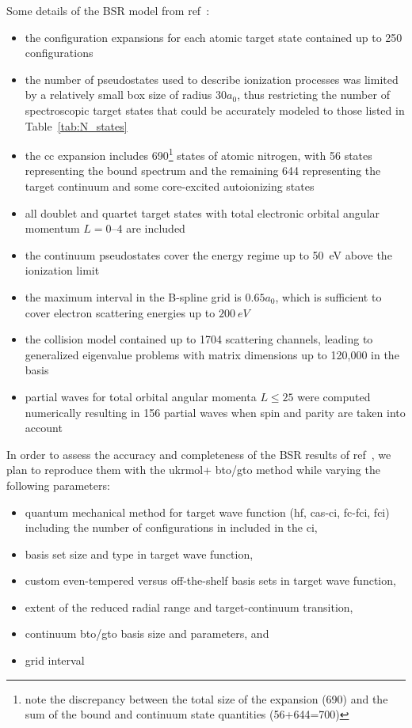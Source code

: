 Some details of the BSR model from ref~\cite{wang2014}:
\begin{itemize}
		\item the configuration expansions for each atomic target state
				contained up to 250 configurations
		\item the number of pseudostates used to describe ionization processes
				was limited by a relatively small box size of radius $30 a_0$, thus 
				restricting the number of spectroscopic target states that could be
				accurately modeled to those listed in Table~\ref{tab:N_states}
		\item the \ac{cc} expansion includes 690\footnote{note the discrepancy
				between the total size of the expansion (690) and the sum of the bound and continuum
				state quantities (56+644=700)} states of atomic
				nitrogen, with 56 states representing the bound spectrum
				and the remaining 644 representing the target continuum
				and some core-excited autoionizing states
		\item all doublet and quartet target states with total electronic orbital
				angular momentum $L = 0–4$ are included
		\item the continuum pseudostates cover the energy regime up to 50~eV
				above the ionization limit
		\item the maximum interval in the B-spline grid is $0.65 a_0$, which is
				sufficient to cover electron scattering energies up to $200~eV$
		\item the collision model contained up to 1704 scattering channels, leading to generalized eigenvalue
				problems with matrix dimensions up to 120,000 in the \bspline{} basis 
		\item partial waves for total orbital angular momenta $L\le25$ were computed numerically
				resulting in 156 partial waves when spin and parity are taken into account
\end{itemize}

In order to assess the accuracy and completeness of the BSR results of ref~\cite{wang2014}, we plan to reproduce them with the \ac{ukrmol+}
				\ac{bto}/\ac{gto} method while varying the following parameters: 
				\begin{itemize}
						\item quantum mechanical method for target wave function (\ac{hf}, 
								\ac{cas}-\ac{ci}, \ac{fc}-\ac{fci}, \ac{fci}) including the number of configurations in included in the \ac{ci},
						\item basis set size and type in target wave function,
						\item custom even-tempered versus off-the-shelf basis sets in target
								wave function, 
						\item extent of the reduced radial range and target-continuum transition,
						\item continuum \ac{bto}/\ac{gto} basis size and parameters, and
						\item \bspline{} grid interval
				\end{itemize} 


